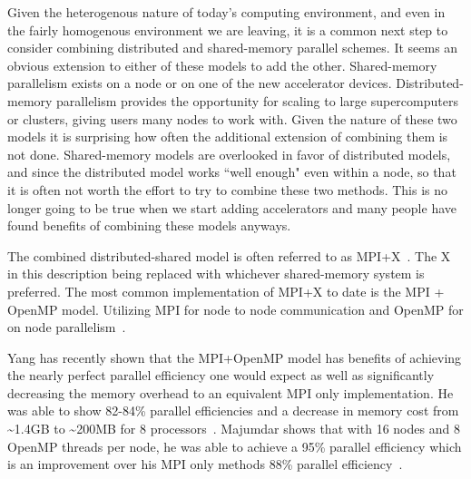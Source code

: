 %
Given the heterogenous nature of today's computing environment, and even in the fairly homogenous environment we are leaving, it is a common next step to consider combining distributed and shared-memory parallel schemes.
%
It seems an obvious extension to either of these models to add the other.
%
Shared-memory parallelism exists on a node or on one of the new accelerator devices.
%
Distributed-memory parallelism provides the opportunity for scaling to large supercomputers or clusters, giving users many nodes to work with.
%
Given the nature of these two models it is surprising how often the additional extension of combining them is not done. 
%
Shared-memory models are overlooked in favor of distributed models, and since the distributed model works ``well enough" even within a node, so that it is often not worth the effort to try to combine these two methods.
%
This is no longer going to be true when we start adding accelerators and many people have found benefits of combining these models anyways.
%

%
The combined distributed-shared model is often referred to as MPI+X~\cite{michaelwolfe2014}.
%
The X in this description being replaced with whichever shared-memory system is preferred.
%
The most common implementation of MPI+X to date is the MPI + OpenMP model.
%
Utilizing MPI for node to node communication and OpenMP for on node parallelism~\cite{michaelwolfe2014}.
%

%
Yang has recently shown that the MPI+OpenMP model has benefits of achieving the nearly perfect parallel efficiency one would expect as well as significantly decreasing the memory overhead to an equivalent MPI only implementation.
%
He was able to show 82-84\% parallel efficiencies and a decrease in memory cost from \textasciitilde1.4GB to \textasciitilde200MB for 8 processors~\cite{yanghybrid}.
%
Majumdar shows that with 16 nodes and 8 OpenMP threads per node, he was able to achieve a 95\% parallel efficiency which is an improvement over his MPI only methods 88\% parallel efficiency~\cite{majumdar2000parallel}. 
%
